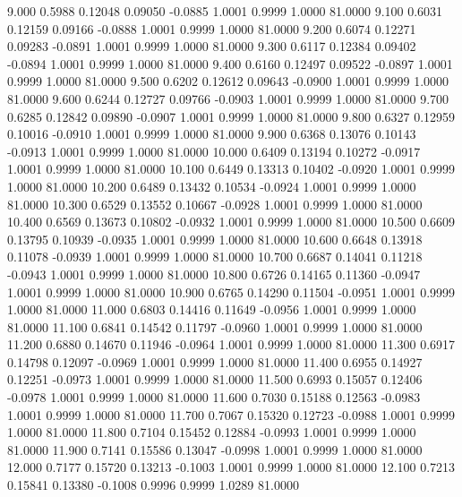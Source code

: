    9.000   0.5988   0.12048   0.09050  -0.0885   1.0001   0.9999   1.0000  81.0000
   9.100   0.6031   0.12159   0.09166  -0.0888   1.0001   0.9999   1.0000  81.0000
   9.200   0.6074   0.12271   0.09283  -0.0891   1.0001   0.9999   1.0000  81.0000
   9.300   0.6117   0.12384   0.09402  -0.0894   1.0001   0.9999   1.0000  81.0000
   9.400   0.6160   0.12497   0.09522  -0.0897   1.0001   0.9999   1.0000  81.0000
   9.500   0.6202   0.12612   0.09643  -0.0900   1.0001   0.9999   1.0000  81.0000
   9.600   0.6244   0.12727   0.09766  -0.0903   1.0001   0.9999   1.0000  81.0000
   9.700   0.6285   0.12842   0.09890  -0.0907   1.0001   0.9999   1.0000  81.0000
   9.800   0.6327   0.12959   0.10016  -0.0910   1.0001   0.9999   1.0000  81.0000
   9.900   0.6368   0.13076   0.10143  -0.0913   1.0001   0.9999   1.0000  81.0000
  10.000   0.6409   0.13194   0.10272  -0.0917   1.0001   0.9999   1.0000  81.0000
  10.100   0.6449   0.13313   0.10402  -0.0920   1.0001   0.9999   1.0000  81.0000
  10.200   0.6489   0.13432   0.10534  -0.0924   1.0001   0.9999   1.0000  81.0000
  10.300   0.6529   0.13552   0.10667  -0.0928   1.0001   0.9999   1.0000  81.0000
  10.400   0.6569   0.13673   0.10802  -0.0932   1.0001   0.9999   1.0000  81.0000
  10.500   0.6609   0.13795   0.10939  -0.0935   1.0001   0.9999   1.0000  81.0000
  10.600   0.6648   0.13918   0.11078  -0.0939   1.0001   0.9999   1.0000  81.0000
  10.700   0.6687   0.14041   0.11218  -0.0943   1.0001   0.9999   1.0000  81.0000
  10.800   0.6726   0.14165   0.11360  -0.0947   1.0001   0.9999   1.0000  81.0000
  10.900   0.6765   0.14290   0.11504  -0.0951   1.0001   0.9999   1.0000  81.0000
  11.000   0.6803   0.14416   0.11649  -0.0956   1.0001   0.9999   1.0000  81.0000
  11.100   0.6841   0.14542   0.11797  -0.0960   1.0001   0.9999   1.0000  81.0000
  11.200   0.6880   0.14670   0.11946  -0.0964   1.0001   0.9999   1.0000  81.0000
  11.300   0.6917   0.14798   0.12097  -0.0969   1.0001   0.9999   1.0000  81.0000
  11.400   0.6955   0.14927   0.12251  -0.0973   1.0001   0.9999   1.0000  81.0000
  11.500   0.6993   0.15057   0.12406  -0.0978   1.0001   0.9999   1.0000  81.0000
  11.600   0.7030   0.15188   0.12563  -0.0983   1.0001   0.9999   1.0000  81.0000
  11.700   0.7067   0.15320   0.12723  -0.0988   1.0001   0.9999   1.0000  81.0000
  11.800   0.7104   0.15452   0.12884  -0.0993   1.0001   0.9999   1.0000  81.0000
  11.900   0.7141   0.15586   0.13047  -0.0998   1.0001   0.9999   1.0000  81.0000
  12.000   0.7177   0.15720   0.13213  -0.1003   1.0001   0.9999   1.0000  81.0000
  12.100   0.7213   0.15841   0.13380  -0.1008   0.9996   0.9999   1.0289  81.0000
